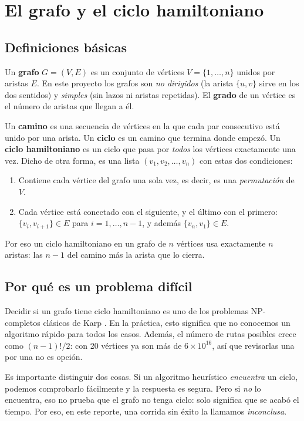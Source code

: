 \chapter{El grafo y el ciclo hamiltoniano}
\label{cap:grafo}

\section{Definiciones básicas}
Un \textbf{grafo} $G=(V,E)$ es un conjunto de vértices $V=\{1,\dots,n\}$ unidos por aristas $E$.
En este proyecto los grafos son \emph{no dirigidos} (la arista $\{u,v\}$ sirve en los dos
sentidos) y \emph{simples} (sin lazos ni aristas repetidas). El \textbf{grado} de un vértice es el
número de aristas que llegan a él.

Un \textbf{camino} es una secuencia de vértices en la que cada par consecutivo está unido por una
arista. Un \textbf{ciclo} es un camino que termina donde empezó. Un \textbf{ciclo hamiltoniano}
es un ciclo que pasa por \emph{todos} los vértices exactamente una vez. Dicho de otra forma, es
una lista $(v_1,v_2,\dots,v_n)$ con estas dos condiciones:
\begin{enumerate}
  \item Contiene cada vértice del grafo una sola vez, es decir, es una \emph{permutación} de $V$.
  \item Cada vértice está conectado con el siguiente, y el último con el primero:
        $\{v_i,v_{i+1}\}\in E$ para $i=1,\dots,n-1$, y además $\{v_n,v_1\}\in E$.
\end{enumerate}
Por eso un ciclo hamiltoniano en un grafo de $n$ vértices usa exactamente $n$ aristas: las $n-1$
del camino más la arista que lo cierra.

\section{Por qué es un problema difícil}
Decidir si un grafo tiene ciclo hamiltoniano es uno de los problemas NP-completos clásicos de
Karp \cite{de1}. En la práctica, esto significa que no conocemos un algoritmo rápido para
todos los casos. Además, el número de rutas posibles crece como $(n-1)!/2$: con 20 vértices ya son
más de $6\times10^{16}$, así que revisarlas una por una no es opción.

Es importante distinguir dos cosas. Si un algoritmo heurístico \emph{encuentra} un ciclo, podemos
comprobarlo fácilmente y la respuesta es segura. Pero si \emph{no} lo encuentra, eso no prueba
que el grafo no tenga ciclo: solo significa que se acabó el tiempo. Por eso, en este reporte,
una corrida sin éxito la llamamos \emph{inconclusa}.

